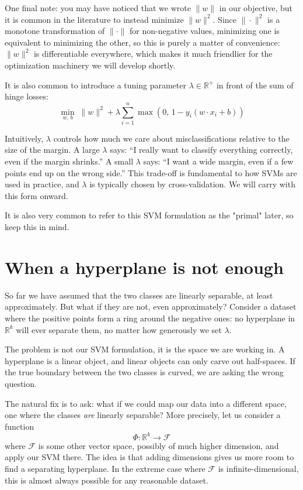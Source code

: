 \documentclass[12pt,a4paper]{article}
\begin{document}
One final note: you may have noticed that we wrote $\|w\|$ in our objective,
but it is common in the literature to instead minimize $\|w\|^2$. Since
$\|\cdot\|^2$ is a monotone transformation of $\|\cdot\|$ for non-negative
values, minimizing one is equivalent to minimizing the other, so this is
purely a matter of convenience: $\|w\|^2$ is differentiable everywhere,
which makes it much friendlier for the optimization machinery we will
develop shortly.

It is also common to introduce a tuning parameter $\lambda \in \mathbb{R}^+$
in front of the sum of hinge losses:
\[
\min_{w,\,b}\; \|w\|^2 + \lambda \sum_{i=1}^{n}
\max\!\left(0,\, 1 - y_i(w \cdot x_i + b)\right)
\]

Intuitively, $\lambda$ controls how much we care about misclassifications
relative to the size of the margin. A large $\lambda$ says: ``I really want
to classify everything correctly, even if the margin shrinks.'' A small
$\lambda$ says: ``I want a wide margin, even if a few points end up on the
wrong side.'' This trade-off is fundamental to how SVMs are used in practice,
and $\lambda$ is typically chosen by cross-validation. We will carry with this
form onward.

It is also very common to refer to this SVM formulation as the "primal" later, so keep this in mind.

\newpage

\section{When a hyperplane is not enough}

So far we have assumed that the two classes are linearly separable, at
least approximately. But what if they are not, even approximately? Consider
a dataset where the positive points form a ring around the negative ones:
no hyperplane in $\mathbb{R}^k$ will ever separate them, no matter how
generously we set $\lambda$.

The problem is not our SVM formulation, it is the space we are working in.
A hyperplane is a linear object, and linear objects can only carve out
half-spaces. If the true boundary between the two classes is curved, we are
asking the wrong question.

The natural fix is to ask: what if we could map our data into a different
space, one where the classes \emph{are} linearly separable? More precisely,
let us consider a function
\[
\Phi : \mathbb{R}^k \to \mathcal{F}
\]
where $\mathcal{F}$ is some other vector space, possibly of much higher
dimension, and apply our SVM there. The idea is that adding dimensions gives
us more room to find a separating hyperplane. In the extreme case where
$\mathcal{F}$ is infinite-dimensional, this is almost always possible for
any reasonable dataset.
\end{document}
